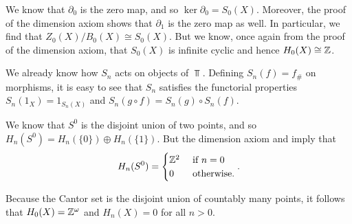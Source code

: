 \documentclass[../../solutions.tex]{subfiles}
\begin{document}
\begin{exercise} \leavevmode
We know that $\partial_0$ is the zero map, and so $\ker\partial_0=S_0(X)$. 
Moreover, the proof of the dimension axiom shows that $\partial_1$ is the zero map as well. 
In particular, we find that $Z_0(X)/B_0(X)\cong S_0(X)$. 
But we know, once again from the proof of the dimension axiom, that $S_0(X)$ is infinite cyclic and hence $H_0(X)\cong\mathbb{Z}$. 
\end{exercise}

\begin{exercise} \leavevmode
We already know how $S_n$ acts on objects of $\Top$. 
Defining $S_n(f)=f_\#$ on morphisms, it is easy to see that $S_n$ satisfies the functorial properties $S_n(1_X)=1_{S_n(X)}$ and $S_n(g\circ f)=S_n(g)\circ S_n(f)$. 
\end{exercise}

\begin{exercise} \leavevmode
We know that $S^0$ is the disjoint union of two points, and so $H_n(S^0)=H_n(\{0\})\oplus H_n(\{1\})$. 
But the dimension axiom and  imply that \[H_n(S^0)=\begin{cases}\mathbb{Z}^2&~\text{if}~n=0\\0&~\text{otherwise}.\end{cases}.\]
\end{exercise}

\begin{exercise} \leavevmode
Because the Cantor set is the disjoint union of countably many points, it follows that $H_0(X)=\mathbb{Z}^\omega$ and $H_n(X)=0$ for all $n>0$. 
\end{exercise}
\end{document}

